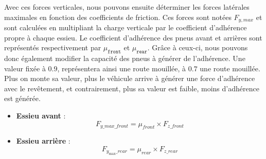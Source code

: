 Avec ces forces verticales, nous pouvons ensuite déterminer les forces latérales maximales en fonction des coefficients de friction. Ces forces sont notées $F_{y, max}$ et sont calculées en multipliant la charge verticale par le coefficient d'adhérence propre à chaque essieu. Le coefficient d'adhérence des pneus avant et arrières sont représentés respectivement par $\mu_{\texttt{front}}$ et $\mu_{\texttt{rear}}$. Grâce à ceux-ci, nous pouvons donc également modifier la capacité des pneus à générer de l'adhérence. Une valeur fixée à $0.9$, représentera ainsi une route mouillée, à $0.7$ une route mouillée. Plus on monte sa valeur, plus le véhicule arrive à générer une force d'adhérence avec le revêtement, et contrairement, plus sa valeur est faible, moins d'adhérence est générée.

\begin{itemize}
\item \textbf{Essieu avant} :
$$F_{y\_max\_front}= \mu_{front} \times F_{z\_front}$$
\item \textbf{Essieu arrière} :
$$F_{y_\max\_rear} = \mu_{rear} \times F_{z\_rear}$$
\end{itemize}


